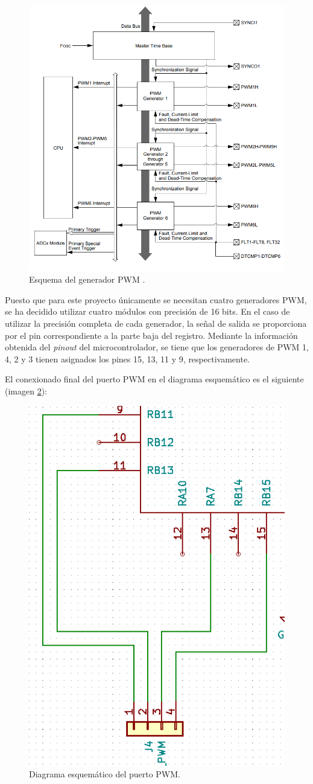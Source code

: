 \begin{itemize}
    \begin{figure}[H]
    \centering 
    \includegraphics[width=.6\linewidth]{pictures/PWMdatasheet.PNG}
    \caption{Esquema del generador PWM \cite{DsPIC33EP512GM60416BitMicrocontrollers}.}
    \label{fig:PWM_Datasheet}
    \end{figure}
    
    Puesto que para este proyecto únicamente se necesitan cuatro generadores PWM, se ha decidido utilizar cuatro módulos con precisión de 16 bits. En el caso de utilizar la precisión completa de cada generador, la señal de salida se proporciona por el pin correspondiente a la parte baja del registro. Mediante la información obtenida del \textit{pinout} del microcontrolador, se tiene que los generadores de PWM 1, 4, 2 y 3 tienen asignados los pines 15, 13, 11 y 9, respectivamente.
    
    El conexionado final del puerto PWM en el diagrama esquemático es el siguiente (imagen \ref{fig:PWM_Esquematico}):
    
    \begin{figure}[H]
    \centering 
    \includegraphics[width=.45\linewidth]{pictures/PWM.PNG}
    \caption{Diagrama esquemático del puerto PWM.}
    \label{fig:PWM_Esquematico}
    \end{figure}


\end{itemize}
